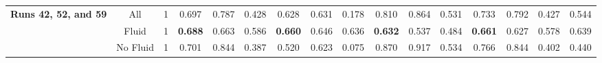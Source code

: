 \begin{table}[!ht]
{\begin{tabular}{|c|c|c|ccc|ccc|ccc|c|c|c|c|}
			\hline
			\hline
			
			\multirow{3}{*}{\parbox{2cm}{\textbf{Runs 42, 52, and 59}}} & All & 1 & \multicolumn{1}{c|}{0.697} & \multicolumn{1}{c|}{0.787} & 0.428 & \multicolumn{1}{c|}{0.628} & \multicolumn{1}{c|}{0.631} & 0.178 & \multicolumn{1}{c|}{0.810} & \multicolumn{1}{c|}{0.864} & 0.531 & 0.733 & 0.792 & 0.427 & 0.544 \\
			
			& Fluid & 1 & \multicolumn{1}{c|}{\textbf{0.688}} & \multicolumn{1}{c|}{0.663} & 0.586 & \multicolumn{1}{c|}{\textbf{0.660}} & \multicolumn{1}{c|}{0.646} & 0.636 & \multicolumn{1}{c|}{\textbf{0.632}} & \multicolumn{1}{c|}{0.537} & 0.484 & \textbf{0.661} & 0.627 & 0.578 & 0.639 \\
			
			& No Fluid & 1 & \multicolumn{1}{c|}{0.701} & \multicolumn{1}{c|}{0.844} & 0.387 & \multicolumn{1}{c|}{0.520} & \multicolumn{1}{c|}{0.623} & 0.075 & \multicolumn{1}{c|}{0.870} & \multicolumn{1}{c|}{0.917} & 0.534 & 0.766 & 0.844 & 0.402 & 0.440 \\
			
			\hline
			
	\end{tabular}}
	\label{tab:Experiment1VsExperiment2}
\end{table}

